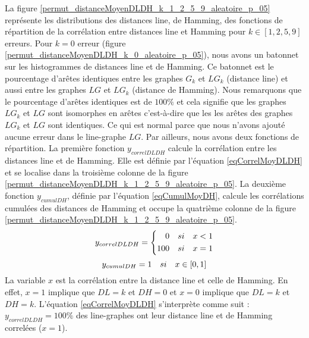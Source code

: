 La figure \ref{permut_distanceMoyenDLDH_k_1_2_5_9_aleatoire_p_05} repr\'esente les distributions des distances line, de Hamming, des fonctions de r\'epartition de la corr\'elation entre distances line et Hamming pour $k \in [1,2,5,9]$ erreurs. 
\newline
Pour $k=0$ erreur (figure \ref{permut_distanceMoyenDLDH_k_0_aleatoire_p_05}), nous avons un batonnet sur les histogrammes de distances line et de Hamming. Ce batonnet est le pourcentage d'ar\^etes identiques entre les graphes $G_k$ et $LG_k$ (distance line) et aussi entre les graphes  $LG$ et $LG_k$ (distance de Hamming). Nous remarquons que le pourcentage d'ar\^etes identiques est de $100\%$ et cela signifie que les graphes $LG_k$ et $LG$ sont isomorphes en ar\^etes c'est-\`a-dire que les  les ar\^etes des graphes $LG_k$ et $LG$ sont identiques. Ce qui est normal parce que nous n'avons ajout\'e aucune erreur dans le line-graphe $LG$. 
Par ailleurs, nous avons deux fonctions de r\'epartition. La premi\`ere fonction $y_{correlDLDH}$ calcule la corr\'elation entre les distances line et de Hamming. Elle est d\'efinie par l'\'equation \ref{eqCorrelMoyDLDH} et se localise dans la troisi\`eme colonne de la figure \ref{permut_distanceMoyenDLDH_k_1_2_5_9_aleatoire_p_05}. La deuxi\`eme fonction $y_{cumulDH}$, d\'efinie par l'\'equation \ref{eqCumulMoyDH}, calcule les corr\'elations cumul\'ees des distances de Hamming et occupe la quatri\`eme colonne de la figure \ref{permut_distanceMoyenDLDH_k_1_2_5_9_aleatoire_p_05}.
\begin{equation}
\label{eqCorrelMoyDLDH}
y_{correlDLDH} = \left\{
	\begin{aligned}
	0 \hspace{1 em} si \hspace{1 em} x < 1 \\
	100  \hspace{1 em}  si  \hspace{1 em}  x = 1
	\end{aligned}
	\right.
\end{equation}
\begin{equation}
\label{eqCumulMoyDH}
y_{cumulDH} = 1  \hspace{1 em}  si  \hspace{1 em}   x \in [0,1]
\end{equation}
La variable $x$ est la corr\'elation entre la distance line et celle de Hamming.
En effet,  $x = 1$ implique que $DL = k$ et $DH = 0$ et  $x = 0$ implique que $DL = k$ et $DH = k$.
L'\'equation  \ref{eqCorrelMoyDLDH} s'interpr\`ete comme suit : $y_{correlDLDH} = 100\%$ des line-graphes ont leur distance line et de Hamming correl\'ees ($x = 1$).
